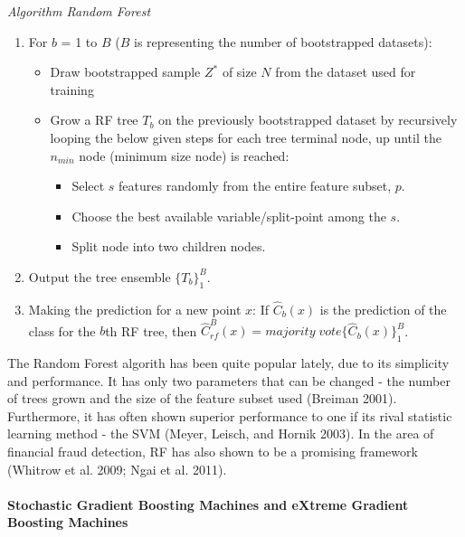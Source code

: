 \documentclass[12pt,]{article}
\providecommand{\tightlist}{%
  \setlength{\itemsep}{0pt}\setlength{\parskip}{0pt}}
\let\oldparagraph\paragraph
\renewcommand{\paragraph}[1]{\oldparagraph{#1}\mbox{}}
\begin{document}
\emph{Algorithm Random Forest}

\begin{enumerate}
\def\labelenumi{\arabic{enumi}.}
\tightlist
\item
  For \(b\) = 1 to \(B\) (\(B\) is representing the number of
  bootstrapped datasets):

  \begin{itemize}
  \tightlist
  \item
    Draw bootstrapped sample \(Z^*\) of size \(N\) from the dataset used
    for training
  \item
    Grow a RF tree \(T_b\) on the previously bootstrapped dataset by
    recursively looping the below given steps for each tree terminal
    node, up until the \(n_{min}\) node (minimum size node) is reached:

    \begin{itemize}
    \tightlist
    \item
      Select \(s\) features randomly from the entire feature subset,
      \(p\).
    \item
      Choose the best available variable/split-point among the \(s\).
    \item
      Split node into two children nodes.
    \end{itemize}
  \end{itemize}
\item
  Output the tree ensemble \(\{T_b\}^{B}_{1}\).
\item
  Making the prediction for a new point \(x\): If \(\widehat{C}_b(x)\)
  is the prediction of the class for the \(b\)th RF tree, then
  \(\widehat{C}_{rf}^{B}(x)=majority\;vote\{\widehat{C}_b(x)\}_{1}^{B}\).
\end{enumerate}

The Random Forest algorith has been quite popular lately, due to its
simplicity and performance. It has only two parameters that can be
changed - the number of trees grown and the size of the feature subset
used (Breiman 2001). Furthermore, it has often shown superior
performance to one if its rival statistic learning method - the SVM
(Meyer, Leisch, and Hornik 2003). In the area of financial fraud
detection, RF has also shown to be a promising framework (Whitrow et al.
2009; Ngai et al. 2011).

\hypertarget{stochastic-gradient-boosting-machines-and-extreme-gradient-boosting-machines}{%
\paragraph{Stochastic Gradient Boosting Machines and eXtreme Gradient
Boosting
Machines}\label{stochastic-gradient-boosting-machines-and-extreme-gradient-boosting-machines}}
\end{document}
